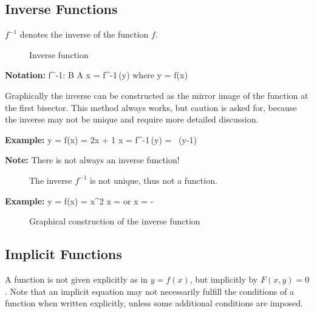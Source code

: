 \subsection{Inverse Functions}

$f^{-1}$ denotes the inverse of the function $f$. \vs

\begin{figure}[!h]
   \centerline{\epsfxsize=11cm  } \svs
    \caption{Inverse function} \label{fig4}
\end{figure} \vs

{\bf Notation:}
\bnn f^{-1}: \; B \rightarrow A \enn \svs
\bnn x = f^{-1}\,(y) \qquad \mbox{where} \qquad y = f(x) \enn \svs

Graphically the inverse can be constructed as the mirror image of the function at the
first bisector. This method always works, but caution is asked for, because the inverse 
may not be unique and require more detailed discussion.

{\bf Example:}
\bnn y = f(x) = 2x + 1  \qquad  x = f^{-1}\,(y) =  \, (y-1) \enn

{\bf Note:} There is not always an inverse function!  \vs

\begin{figure}[!h]
   \centerline{\epsfxsize=11cm } \svs
    \caption{The inverse $f^{-1}$ is not unique, thus not a function.} \label{fig5}
\end{figure} \vs


{\bf Example:}
\bnn y = f(x) = x^2 \enn
\bnn x =  \qquad \mbox{or} \qquad x = - \enn  \vs

\begin{figure}[!h]
    \centering
    \hspace*{0.5cm}
     \svs
    \caption{Graphical construction of the inverse function} \label{fig6}
\end{figure}

\newpage
\subsection{Implicit Functions}
A function is not given explicitly as in $y = f(x)$, but
implicitly by $F(x,y) = 0$. Note that an implicit equation may not necessarily fulfill
the conditions of a function when written explicitly, unless some additional conditions
are imposed.

